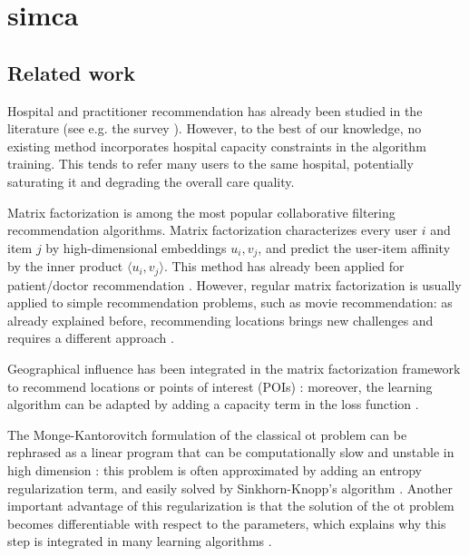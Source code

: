 \chapter{\acf{simca}}

\section{Related work}
Hospital and practitioner recommendation has already been studied in the
literature (see e.g. the survey \cite{tran_recommender_2021}). However, to the
best of our knowledge, no existing method incorporates hospital capacity
constraints in the algorithm training. This tends to refer many users to the
same hospital, potentially saturating it and degrading the overall care quality.

Matrix factorization \cite{koren_matrix_2009} is among the most popular
collaborative filtering recommendation algorithms. Matrix factorization
characterizes every user $i$ and item $j$ by high-dimensional embeddings $u_i,
    v_j$, and predict the user-item affinity by the inner product $\langle u_i, v_j
    \rangle$. This method has already been applied for patient/doctor recommendation
\cite{zhang_idoctor_2017, han_hybrid_2018}. However, regular matrix
factorization is usually applied to simple recommendation problems, such as
movie recommendation: as already explained before, recommending locations brings
new challenges and requires a different approach \cite{zhao_survey_2016}.

Geographical influence has been integrated in the matrix factorization framework
to recommend locations or points of interest (POIs) \cite{li_rank-geofm_2015}:
moreover, the learning algorithm can be adapted by adding a capacity term in the
loss function \cite{christakopoulou_recommendation_2017}.

The Monge-Kantorovitch formulation of the classical \ac{ot} problem can be
rephrased as a linear program that can be computationally slow and unstable in
high dimension \cite{cuturi_sinkhorn_2013}: this problem is often approximated
by adding an entropy regularization term, and easily solved by Sinkhorn-Knopp's
algorithm \cite{cuturi_sinkhorn_2013}. Another important advantage of this
regularization is that the solution of the \ac{ot} problem becomes
differentiable with respect to the parameters, which explains why this step is
integrated in many learning algorithms
\cite{genevay_learning_2017,cuturi_soft-dtw_2018,tai_sinkhorn_2021}.

